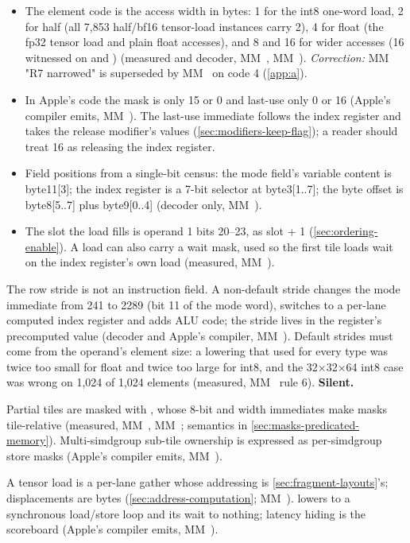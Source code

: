 \begin{itemize}
\item The element code is the access width in bytes: 1 for the int8 one-word load, 2 for half (all 7,853 half/bf16 tensor-load
  instances carry 2), 4 for float (the fp32 tensor load and plain float accesses), and 8 and 16 for wider accesses (16
  witnessed on  and ) (measured and decoder, MM~, MM~).
  \emph{Correction:} MM~
  "R7 narrowed" is superseded by MM~ on code 4 (\cref{app:a}).
\item In Apple's code the mask is only 15 or 0 and last-use only 0 or 16 (Apple's compiler emits, MM~). The last-use
  immediate follows the index register and takes the release modifier's values (\cref{sec:modifiers-keep-flag}); a reader should treat 16
  as releasing the index register.
\item Field positions from a single-bit census: the mode field's variable content is byte11{[}3{]}; the index register is a
  7-bit selector at byte3{[}1..7{]}; the byte offset is byte8{[}5..7{]} plus byte9{[}0..4{]} (decoder only, MM~).
\item The slot the load fills is operand 1 bits 20–23, as slot + 1 (\cref{sec:ordering-enable}). A load can also carry a wait mask, used so the
  first tile loads wait on the index register's own load (measured, MM~).
\end{itemize}

The row stride is not an instruction field. A non-default stride changes the mode immediate from 241 to
2289 (bit 11 of the mode word), switches to a per-lane computed index register and adds ALU code; the stride lives in
the register's precomputed value (decoder and Apple's compiler, MM~). Default strides must come from the operand's
element size: a lowering that used  for every type was twice too small for float and twice too large for int8,
and the 32×32×64 int8 case was wrong on 1,024 of 1,024 elements (measured, MM~ rule 6). \textbf{Silent.}

Partial tiles are masked with , whose 8-bit  and width immediates
make masks tile-relative (measured, MM~, MM~; semantics in \cref{sec:masks-predicated-memory}). Multi-simdgroup sub-tile ownership is
expressed as per-simdgroup store masks (Apple's compiler emits, MM~).

A tensor load is a per-lane gather whose addressing is \cref{sec:fragment-layouts}'s; displacements are bytes
(\cref{sec:address-computation}; MM~).  lowers to a synchronous load/store loop and its wait to
nothing; latency hiding is the scoreboard (Apple's compiler emits, MM~).

